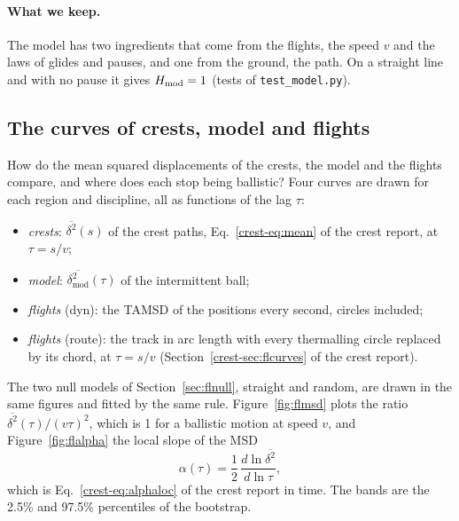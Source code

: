 \documentclass[11pt,a4paper]{article}
\newcommand{\code}[1]{\texttt{#1}}
\begin{document}
\paragraph{What we keep.} The model has two ingredients that come from the flights, the speed $v$ and the laws of
glides and pauses, and one from the ground, the path. On a straight line and with no pause it gives $H_{\mathrm{mod}} = 1$
(tests of \code{test\_model.py}).

\subsection{The curves of crests, model and flights}\label{sec:flcurves}

How do the mean squared displacements of the crests, the model and the flights compare, and where does each stop
being ballistic? Four curves are drawn for each region and discipline, all as functions of the lag $\tau$:
\begin{itemize}[nosep]
  \item \emph{crests}: $\overline{\delta^2}(s)$ of the crest paths, Eq.~\eqref{crest-eq:mean} of the crest report, at $\tau = s/v$;
  \item \emph{model}: $\overline{\delta^2_{\mathrm{mod}}}(\tau)$ of the intermittent ball;
  \item \emph{flights} (dyn): the TAMSD of the positions every second, circles included;
  \item \emph{flights} (route): the track in arc length with every thermalling circle replaced by its chord, at
        $\tau = s/v$ (Section~\ref{crest-sec:flcurves} of the crest report).
\end{itemize}
The two null models of Section~\ref{sec:flnull}, straight and random, are drawn in the same figures and fitted by the
same rule. Figure~\ref{fig:flmsd} plots the ratio $\overline{\delta^2}(\tau)/(v\tau)^2$, which is 1 for a ballistic motion at
speed $v$, and Figure~\ref{fig:flalpha} the local slope of the MSD
\begin{equation}
  \alpha(\tau) = \frac12\,\frac{d\ln\overline{\delta^2}}{d\ln\tau},
  \label{eq:alpha}
\end{equation}
which is Eq.~\eqref{crest-eq:alphaloc} of the crest report in time. The bands are the 2.5\% and 97.5\% percentiles of the bootstrap.
\end{document}
